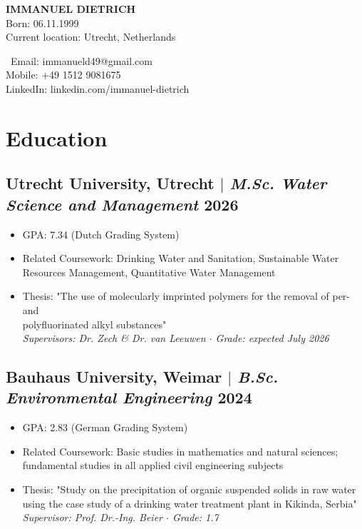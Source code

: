 \documentclass[11pt]{article} %
\begin{document}
\begin{center}
	\begin{minipage}{0.49\textwidth}
		{\LARGE\bfseries
			IMMANUEL DIETRICH %
		} \\ \medskip
		Born: 06.11.1999 \\
		Current location: Utrecht, Netherlands \\ %
	\end{minipage} \hfill
	\begin{minipage}{0.5\textwidth}
		\raggedleft\
		Email: immanueld49@gmail.com \\
		Mobile: +49 1512 9081675 \\
		{\small LinkedIn: linkedin.com/immanuel-dietrich} \\
	\end{minipage}
\end{center}

\section{Education}
\subsection{Utrecht University, Utrecht $|$ {\normalfont\itshape M.Sc. Water Science and Management} \hfill 2026}
\begin{itemize}
	\item GPA: 7.34 (Dutch Grading System)
  	\item Related Coursework: Drinking Water and Sanitation, Sustainable Water Resources Management, Quantitative Water Management
  	\item Thesis: "The use of molecularly imprinted polymers for the removal of per-and \\ polyfluorinated alkyl substances" \\
  	\textit{Supervisors: Dr. Zech \& Dr. van Leeuwen $\cdot$ Grade: expected July 2026}
\end{itemize}

\subsection{Bauhaus University, Weimar $|$ {\normalfont\itshape B.Sc. Environmental Engineering} \hfill 2024}
\begin{itemize}
	\item GPA: 2.83 (German Grading System)
  	\item Related Coursework: Basic studies in mathematics and natural sciences; fundamental studies in all applied civil engineering subjects
	\item Thesis: "Study on the precipitation of organic suspended solids in raw water using the case study of a drinking water treatment plant in Kikinda, Serbia" \\
	\textit{Supervisor:  Prof. Dr.-Ing. Beier $\cdot$ Grade: 1.7}
\end{itemize}
\end{document}
